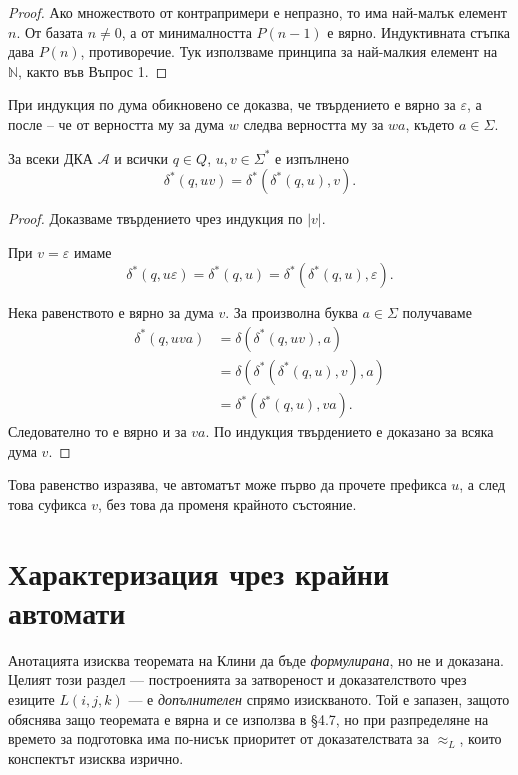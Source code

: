 \begin{proof}
Ако множеството от контрапримери е непразно, то има най-малък елемент $n$. От базата $n\ne0$, а от минималността $P(n-1)$ е вярно. Индуктивната стъпка дава $P(n)$, противоречие. Тук използваме принципа за най-малкия елемент на $\mathbb N$, както във Въпрос 1.
\end{proof}

При индукция по дума обикновено се доказва, че твърдението е вярно за $\varepsilon$, а после -- че от верността му за дума $w$ следва верността му за $wa$, където $a\in\Sigma$.

\begin{prop}
За всеки ДКА $\mathcal A$ и всички $q\in Q$, $u,v\in\Sigma^*$ е изпълнено
\[
\delta^*(q,uv)=\delta^*(\delta^*(q,u),v).
\]
\end{prop}

\begin{proof}
Доказваме твърдението чрез индукция по $|v|$.

При $v=\varepsilon$ имаме
\[
\delta^*(q,u\varepsilon)=\delta^*(q,u)
=\delta^*(\delta^*(q,u),\varepsilon).
\]

Нека равенството е вярно за дума $v$. За произволна буква $a\in\Sigma$ получаваме
\[
\begin{aligned}
\delta^*(q,uva)
&=\delta(\delta^*(q,uv),a)\\
&=\delta(\delta^*(\delta^*(q,u),v),a)\\
&=\delta^*(\delta^*(q,u),va).
\end{aligned}
\]
Следователно то е вярно и за $va$. По индукция твърдението е доказано за всяка дума $v$.
\end{proof}

Това равенство изразява, че автоматът може първо да прочете префикса $u$, а след това суфикса $v$, без това да променя крайното състояние.

\section{Характеризация чрез крайни автомати}\label{s:4.3}

\begin{supp}
Анотацията изисква теоремата на Клини да бъде \emph{формулирана}, но не и
доказана. Целият този раздел --- построенията за затвореност и доказателството
чрез езиците $L(i,j,k)$ --- е \emph{допълнителен} спрямо изискваното. Той е
запазен, защото обяснява защо теоремата е вярна и се използва в \S4.7, но при
разпределяне на времето за подготовка има по-нисък приоритет от доказателствата
за $\approx_L$, които конспектът изисква изрично.
\end{supp}

